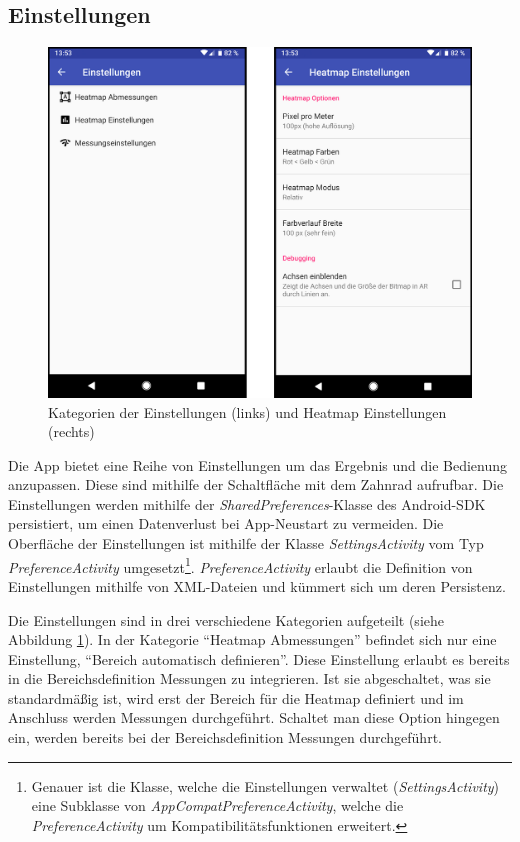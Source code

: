 \documentclass[10pt]{scrartcl}
\begin{document}
\subsection{Einstellungen}
\begin{figure}
\centering
\includegraphics[scale=0.35]{images/einstellungen.png}
\caption{\label{img:einstellungen}Kategorien der Einstellungen (links) und Heatmap Einstellungen (rechts)}
\end{figure}

Die App bietet eine Reihe von Einstellungen um das Ergebnis und die Bedienung anzupassen. Diese sind mithilfe der Schaltfläche mit dem Zahnrad aufrufbar. Die Einstellungen werden mithilfe der \textit{SharedPreferences}-Klasse des Android-SDK persistiert, um einen Datenverlust bei App-Neustart zu vermeiden. Die Oberfläche der Einstellungen ist mithilfe der Klasse \textit{SettingsActivity} vom Typ \textit{PreferenceActivity} umgesetzt\footnote{Genauer ist die Klasse, welche die Einstellungen verwaltet (\textit{SettingsActivity}) eine Subklasse von \textit{AppCompatPreferenceActivity}, welche die \textit{PreferenceActivity} um Kompatibilitätsfunktionen erweitert.}. \textit{PreferenceActivity} erlaubt die Definition von Einstellungen mithilfe von XML-Dateien und kümmert sich um deren Persistenz.

Die Einstellungen sind in drei verschiedene Kategorien aufgeteilt (siehe Abbildung \ref{img:einstellungen}). In der Kategorie \enquote{Heatmap Abmessungen} befindet sich nur eine Einstellung, \enquote{Bereich automatisch definieren}. Diese Einstellung erlaubt es bereits in die Bereichsdefinition Messungen zu integrieren. Ist sie abgeschaltet, was sie standardmäßig ist, wird erst der Bereich für die Heatmap definiert und im Anschluss werden Messungen durchgeführt. Schaltet man diese Option hingegen ein, werden bereits bei der Bereichsdefinition Messungen durchgeführt.
\end{document}
